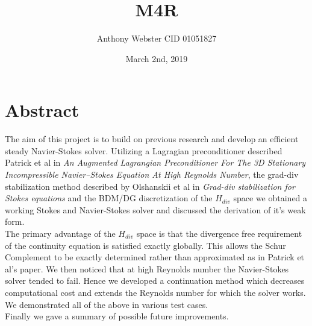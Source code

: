 \documentclass[11pt,twoside,a4paper]{article}
\begin{document}
\setcounter{secnumdepth}{4}
\title{M4R}
\date{March 2nd, 2019}
\author{Anthony Webster CID 01051827}
\maketitle
\clearpage
\section{Abstract}
The aim of this project is to build on previous research and develop an efficient steady Navier-Stokes solver. Utilizing a Lagragian preconditioner described Patrick et al in \textit{An Augmented Lagrangian Preconditioner For The 3D Stationary Incompressible Navier–Stokes Equation At High Reynolds Number}, the grad-div stabilization method described by Olshanskii et al in \textit{Grad-div stabilization for Stokes equations} and the BDM/DG discretization of the $H_{div}$ space we obtained a working Stokes and Navier-Stokes solver and discussed the derivation of it's weak form.\\
The primary advantage of the $H_{div}$ space is that the divergence free requirement of the continuity equation is satisfied exactly globally. This allows the Schur Complement to be exactly determined rather than approximated as in Patrick et al's paper.
We then noticed that at high Reynolds number the Navier-Stokes solver tended to fail. Hence we developed a continuation method which decreases computational cost and extends the Reynolds number for which the solver works.\\
We demonstrated all of the above in various test cases. \\
Finally we gave a summary of possible future improvements.
\clearpage

\tableofcontents
\clearpage
\end{document}
